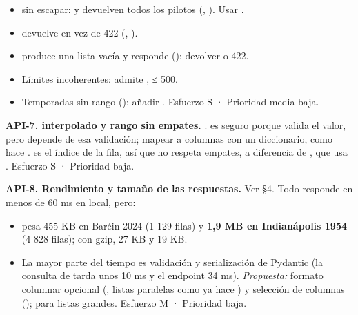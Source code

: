 \begin{itemize}
\item {} sin escapar:  y  devuelven todos los pilotos (, ). Usar .
\item {} devuelve \code{[]} en vez de 422 (, ).
\item {} produce una lista vacía y responde \code{[]} (): devolver  o 422.
\item Límites incoherentes:  admite ,  ≤ 500.
\item Temporadas sin rango (): añadir . Esfuerzo S · Prioridad media-baja.
\end{itemize}

\textbf{API-7.  interpolado y rango sin empates.} .  es seguro porque  valida el valor, pero depende de esa validación; mapear a columnas con un diccionario, como hace .  es el índice de la fila, así que no respeta empates, a diferencia de , que usa . Esfuerzo S · Prioridad baja.

\textbf{API-8. Rendimiento y tamaño de las respuestas.} Ver §4. Todo responde en menos de 60 ms en local, pero:

\begin{itemize}
\item {} pesa 455 KB en Baréin 2024 (1 129 filas) y \textbf{1,9 MB en Indianápolis 1954} (4 828 filas); con gzip, 27 KB y 19 KB.
\item La mayor parte del tiempo es validación y serialización de Pydantic (la consulta de  tarda unos 10 ms y el endpoint 34 ms). \emph{Propuesta:} formato columnar opcional (, listas paralelas como ya hace ) y selección de columnas ();  para listas grandes. Esfuerzo M · Prioridad baja.
\end{itemize}


